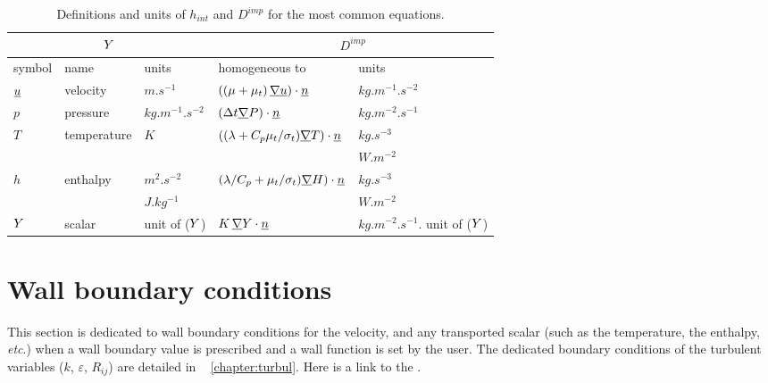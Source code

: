 \begin{table}
\begin{center}
\begin{tabular}{||l|l|l||l|l||}
\hline
\multicolumn{3}{||c||}{$Y$} & \multicolumn{2}{c||}{$D^{imp}$} \\
\hline
symbol     & name                & units         & homogeneous to             & units                                     \\
\hline
$\underline{u}$ & velocity            & $m.s^{-1}$         &$\left( (\mu+\mu_t)\,\underline{\nabla} \underline{u} \right)\cdot \underline{n}$  & $kg.m^{-1}.s^{-2} $       \\
$p$        & pressure            & $kg.m^{-1}.s^{-2}$ &$\left( \Delta t \underline{\nabla} P \right) \cdot \underline{n}$             & $kg.m^{-2}.s^{-1}$                        \\
$T$        & temperature         & $K$                &$\left( (\lambda+C_p\mu_t/\sigma_t)\underline{\nabla} T\right) \cdot \underline{n} $ &$kg.s^{-3}$ \\
                 &                         &                                     &                                  &$W.m^{-2}$ \\
$h$          & enthalpy           & $m^{2}.s^{-2}$          &$\left( \lambda/C_p+\mu_t/\sigma_t) \underline{\nabla} H \right) \cdot \underline{n}$&$kg.s^{-3}$ \\
                 &                        & $J.kg^{-1}$               &                                                                                                               & $W.m^{-2}$  \\
$Y$   & scalar               & unit of ($Y$)       &$K \,\underline{\nabla} Y \cdot \underline{n}$              & $kg.m^{-2}.s^{-1}.$ unit of ($Y$)       \\
\hline
\end{tabular}
\end{center}
\caption{Definitions and units of $h_{int}$ and $D^{imp}$ for the most common equations.}\label{tab:bndcnd:hint_phi_condli}
\end{table}


\section{Wall boundary conditions}\label{sec:clptur}

\hypertarget{wallboundary}{}

This section is dedicated to wall boundary conditions
 for the velocity, and any transported scalar (such as the temperature, the enthalpy, \emph{etc}.)
when a wall boundary value is prescribed and a wall function is set by the user. The dedicated boundary conditions of the turbulent variables ($k$, $\varepsilon$, $R_{ij}$) are detailed in \chaptername~ \ref{chapter:turbul}.
 Here is a link to the .

